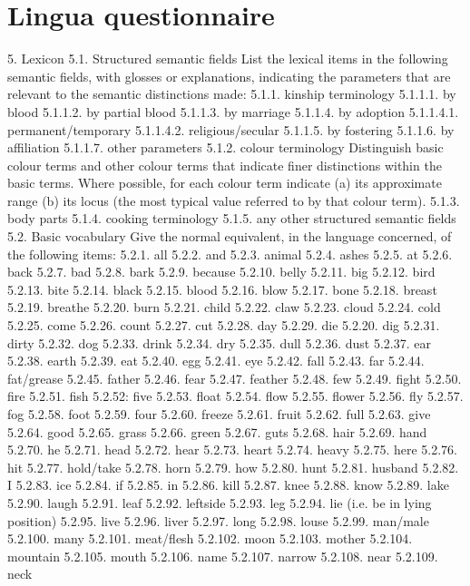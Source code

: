 \section{Lingua questionnaire}
5. Lexicon
5.1. Structured semantic fields
List the lexical items in the following semantic fields, with glosses or explanations, indicating the parameters that are relevant to the semantic distinctions made:
5.1.1. kinship terminology
5.1.1.1. by blood
5.1.1.2. by partial blood
5.1.1.3. by marriage
5.1.1.4. by adoption
5.1.1.4.1. permanent/temporary
5.1.1.4.2. religious/secular
5.1.1.5. by fostering
5.1.1.6. by affiliation
5.1.1.7. other parameters
5.1.2. colour terminology
Distinguish basic colour terms and other colour terms that indicate finer distinctions within the basic terms. Where possible, for each colour term indicate (a) its approximate range (b) its locus (the most typical value referred to by that colour term).
5.1.3. body parts
5.1.4. cooking terminology
5.1.5. any other structured semantic fields
5.2. Basic vocabulary
Give the normal equivalent, in the language concerned, of the following items:
5.2.1. all
5.2.2. and
5.2.3. animal
5.2.4. ashes
5.2.5. at
5.2.6. back
5.2.7. bad
5.2.8. bark
5.2.9. because
5.2.10. belly
5.2.11. big
5.2.12. bird
5.2.13. bite
5.2.14. black
5.2.15. blood
5.2.16. blow
5.2.17. bone
5.2.18. breast
5.2.19. breathe
5.2.20. burn
5.2.21. child
5.2.22. claw
5.2.23. cloud
5.2.24. cold
5.2.25. come
5.2.26. count
5.2.27. cut
5.2.28. day
5.2.29. die
5.2.20. dig
5.2.31. dirty
5.2.32. dog
5.2.33. drink
5.2.34. dry
5.2.35. dull
5.2.36. dust
5.2.37. ear
5.2.38. earth
5.2.39. eat
5.2.40. egg
5.2.41. eye
5.2.42. fall
5.2.43. far
5.2.44. fat/grease
5.2.45. father
5.2.46. fear
5.2.47. feather
5.2.48. few
5.2.49. fight
5.2.50. fire
5.2.51. fish
5.2.52: five
5.2.53. float
5.2.54. flow
5.2.55. flower
5.2.56. fly
5.2.57. fog
5.2.58. foot
5.2.59. four
5.2.60. freeze
5.2.61. fruit
5.2.62. full
5.2.63. give
5.2.64. good
5.2.65. grass
5.2.66. green
5.2.67. guts
5.2.68. hair
5.2.69. hand
5.2.70. he
5.2.71. head
5.2.72. hear
5.2.73. heart
5.2.74. heavy
5.2.75. here
5.2.76. hit
5.2.77. hold/take
5.2.78. horn
5.2.79. how
5.2.80. hunt
5.2.81. husband
5.2.82. I
5.2.83. ice
5.2.84. if
5.2.85. in
5.2.86. kill
5.2.87. knee
5.2.88. know
5.2.89. lake
5.2.90. laugh
5.2.91. leaf
5.2.92. leftside
5.2.93. leg
5.2.94. lie (i.e. be in lying position)
5.2.95. live
5.2.96. liver
5.2.97. long
5.2.98. louse
5.2.99. man/male
5.2.100. many
5.2.101. meat/flesh
5.2.102. moon
5.2.103. mother
5.2.104. mountain
5.2.105. mouth
5.2.106. name
5.2.107. narrow
5.2.108. near
5.2.109. neck
